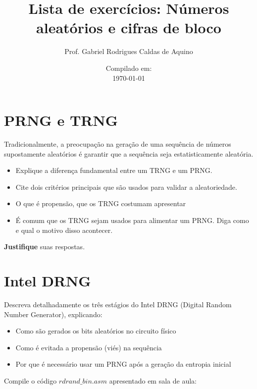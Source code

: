 \title{Lista de exercícios: Números aleatórios e cifras de bloco}
\author{Prof. Gabriel Rodrigues Caldas de Aquino}
\date{Compilado em: \\ \today}



\maketitle

\section{PRNG e TRNG}
Tradicionalmente, a preocupação na geração de uma sequência de números supostamente aleatórios é garantir que a sequência seja estatisticamente aleatória.
\begin{itemize}
    \item Explique a diferença fundamental entre um TRNG e um PRNG.
    \item Cite dois critérios principais que são usados para validar a aleatoriedade.
    \item O que é propensão, que os TRNG costumam apresentar
    \item É comum que os TRNG sejam usados para alimentar um PRNG. Diga como e qual o motivo disso acontecer.
\end{itemize}
\textbf{Justifique} suas respostas.

\section{Intel DRNG}
Descreva detalhadamente os três estágios do Intel DRNG (Digital Random Number Generator), explicando:
\begin{itemize}
    \item   Como são gerados os bits aleatórios no circuito físico

    \item   Como é evitada a propensão (viés) na sequência

    \item    Por que é necessário usar um PRNG após a geração da entropia inicial
\end{itemize}

Compile o código $rdrand\_bin.asm$ apresentado em sala de aula:

